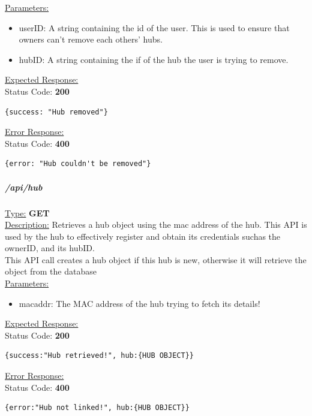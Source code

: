 \documentclass[draft,preprint,12pt,3p]{elsarticle}
\newcommand{\forceindent}{\leavevmode{\parindent=1em\indent}}
\begin{document}
\underline{Parameters:}
\begin{itemize}
\item userID: A string containing the id of the user. This is used to ensure that owners can't remove each others' hubs.

\item hubID: A string containing the if of the hub the user is trying to remove.
\end{itemize}

\underline{Expected Response:}\\[5pt]
\forceindent Status Code: \textbf{200} \\
\begin{verbatim}
{success: "Hub removed"}
\end{verbatim}

\underline{Error Response:}\\[5pt]
\forceindent Status Code: \textbf{400} \\
\begin{verbatim}
{error: "Hub couldn't be removed"}
\end{verbatim}


\subparagraph*{/api/hub}
\underline{Type:} \textbf{GET}\\

\underline{Description:} Retrieves a hub object using the mac address of the hub. This API is used by the hub to effectively register and obtain its credentials suchas the ownerID, and its hubID.\\
This API call creates a hub object if this hub is new, otherwise it will retrieve the object from the database\\

\underline{Parameters:}
\begin{itemize}
\item macaddr: The MAC address of the hub trying to fetch its details!
\end{itemize}
\underline{Expected Response:}\\[5pt]
\forceindent Status Code: \textbf{200} \\
\begin{verbatim}
{success:"Hub retrieved!", hub:{HUB OBJECT}}
\end{verbatim}

\underline{Error Response:}\\[5pt]
\forceindent Status Code: \textbf{400} \\
\begin{verbatim}
{error:"Hub not linked!", hub:{HUB OBJECT}}
\end{verbatim}
\end{document}
